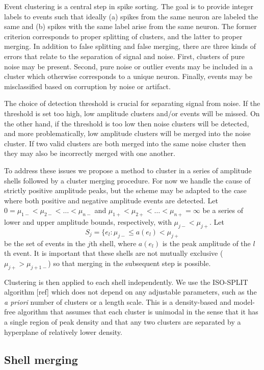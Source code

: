 \documentclass{article}
\begin{document}
Event clustering is a central step in spike sorting. The goal is to provide integer labels to events such that ideally (a) spikes from the same neuron are labeled the same and (b) spikes with the same label arise from the same neuron. The former criterion corresponds to proper splitting of clusters, and the latter to proper merging. In addition to false splitting and false merging, there are three kinds of errors that relate to the separation of signal and noise. First, clusters of pure noise may be present. Second, pure noise or outlier events may be included in a cluster which otherwise corresponds to a unique neuron. Finally, events may be misclassified based on corruption by noise or artifact.

The choice of detection threshold is crucial for separating signal from noise. If the threshold is set too high, low amplitude clusters and/or events will be missed. On the other hand, if the threshold is too low then noise clusters will be detected, and more problematically, low amplitude clusters will be merged into the noise cluster. If two valid clusters are both merged into the same noise cluster then they may also be incorrectly merged with one another.

To address these issues we propose a method to cluster in a series of amplitude shells followed by a cluster merging procedure. For now we handle the cause of strictly positive amplitude peaks, but the scheme may be adapted to the case where both positive and negative amplitude events are detected. Let $0=\mu_{1-}<\mu_{2-}<\dots<\mu_{n-}$ and $\mu_{1+}<\mu_{2+}<\dots<\mu_{n+}=\infty$ be a series of lower and upper amplitude bounds, respectively, with $\mu_{j-}<\mu_{j+}$. Let
$$S_j=\{e_l:\mu_{j-}\leq a(e_l)<\mu_{j+}$$
be the set of events in the $j$th shell, where $a(e_l)$ is the peak amplitude of the $l$th event. It is important that these shells are not mutually exclusive ($\mu_{j+}>\mu_{j+1-}$) so that merging in the subsequent step is possible.

Clustering is then applied to each shell independently. We use the ISO-SPLIT algorithm [ref] which does not depend on any adjustable parameters, such as the \emph{a priori} number of clusters or a length scale. This is a density-based and model-free algorithm that assumes that each cluster is unimodal in the sense that it has a single region of peak density and that any two clusters are separated by a hyperplane of relatively lower density.

\subsection{Shell merging}
\end{document}
